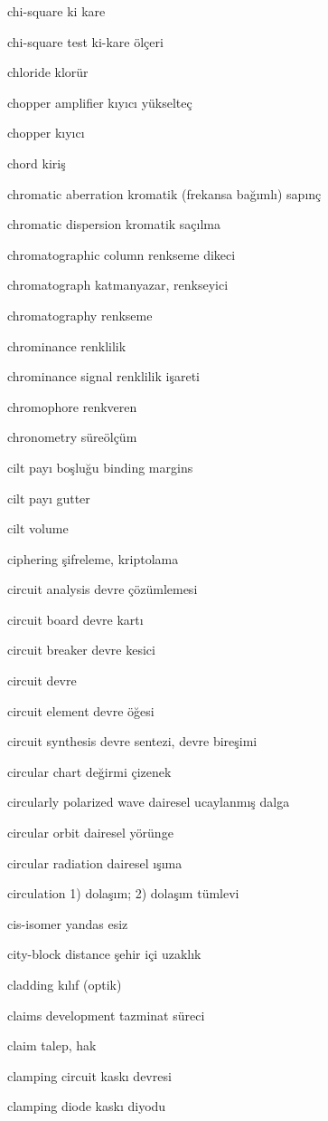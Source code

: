 \documentclass[12pt,fleqn]{article}\usepackage{../../common}
\begin{document}
chi-square ki kare

chi-square test ki-kare ölçeri

chloride klorür

chopper amplifier kıyıcı yükselteç

chopper kıyıcı

chord kiriş

chromatic aberration kromatik (frekansa bağımlı) sapınç

chromatic dispersion kromatik saçılma

chromatographic column renkseme dikeci

chromatograph katmanyazar, renkseyici

chromatography renkseme

chrominance renklilik

chrominance signal renklilik işareti

chromophore renkveren

chronometry süreölçüm

cilt payı boşluğu binding margins

cilt payı gutter

cilt volume

ciphering şifreleme, kriptolama

circuit analysis devre çözümlemesi

circuit board devre kartı

circuit breaker devre kesici

circuit devre

circuit element devre öğesi

circuit synthesis devre sentezi, devre bireşimi

circular chart değirmi çizenek

circularly polarized wave dairesel ucaylanmış dalga

circular orbit dairesel yörünge

circular radiation dairesel ışıma

circulation 1) dolaşım; 2) dolaşım tümlevi

cis-isomer yandas esiz

city-block distance şehir içi uzaklık

cladding kılıf (optik)

claims development tazminat süreci

claim talep, hak

clamping circuit kaskı devresi

clamping diode kaskı diyodu
\end{document}
